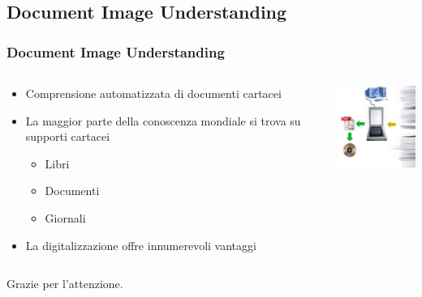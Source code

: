 \documentclass{beamer}
\begin{document}
\subsection{Document Image Understanding}
\begin{frame}
\frametitle{Document Image Understanding}

\begin{columns}
\begin{column}{0.6\textwidth}

\begin{itemize}
\item<1-> Comprensione automatizzata di documenti cartacei
\item<2-> La maggior parte della conoscenza mondiale si trova su supporti cartacei
\begin{itemize}
\item Libri
\item Documenti
\item Giornali
\end{itemize}
\item<3-> La digitalizzazione offre innumerevoli vantaggi
\end{itemize}
\end{column}

\begin{column}{0.2\textwidth}
\includegraphics[width=3cm]{figure/diu.jpg}
\end{column}

\end{columns}

\end{frame}




\begin{frame}
\begin{center}
Grazie per l'attenzione.
\end{center}
\end{frame}
\end{document}
